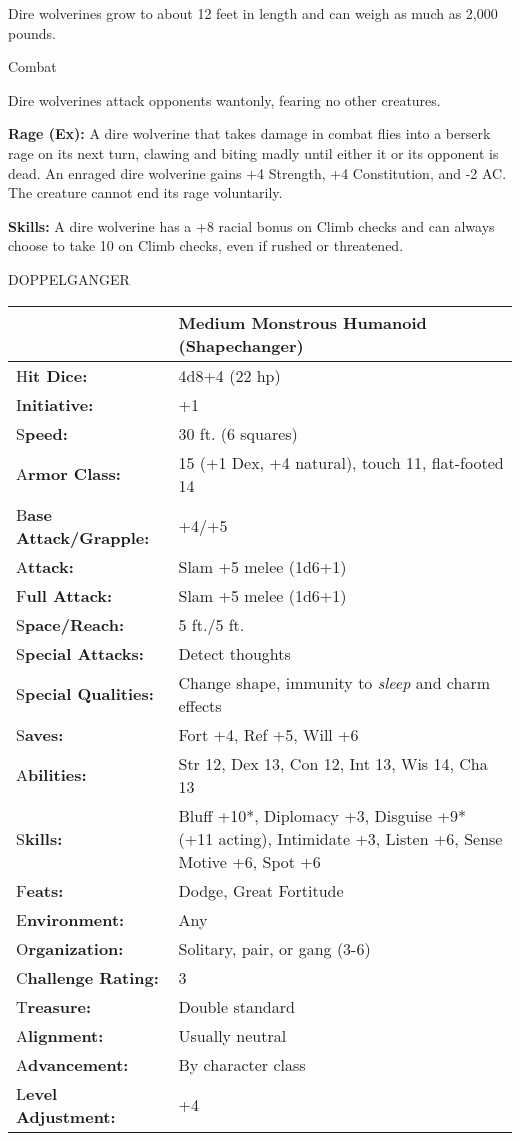 \documentclass{article}
\begin{document}
Dire wolverines grow to about 12 feet in length and can weigh as much as 2,000 
pounds.

Combat

Dire wolverines attack opponents wantonly, fearing no other creatures.

\textbf{Rage (Ex):} A dire wolverine that takes damage in combat flies into a berserk 
rage on its next turn, clawing and biting madly until either it or its opponent 
is dead. An enraged dire wolverine gains +4 Strength, +4 Constitution, and -2 AC. 
The creature cannot end its rage voluntarily.

\textbf{Skills:} A dire wolverine has a +8 racial bonus on Climb checks and can 
always choose to take 10 on Climb checks, even if rushed or threatened.

\vspace{12pt}
{\LARGE{}DOPPELGANGER}

\begin{tabular}{|>{\raggedright}p{91pt}|>{\raggedright}p{200pt}|}
\hline
  & Medium Monstrous Humanoid (Shapechanger)\tabularnewline
\hline
H\textbf{it Dice:} & 4d8+4 (22 hp)\tabularnewline
\hline
I\textbf{nitiative:} & +1\tabularnewline
\hline
S\textbf{peed:} & 30 ft. (6 squares)\tabularnewline
\hline
A\textbf{rmor Class:} & 15 (+1 Dex, +4 natural), touch 11, flat-footed 14\tabularnewline
\hline
B\textbf{ase Attack/Grapple:} & +4/+5\tabularnewline
\hline
A\textbf{ttack:} & Slam +5 melee (1d6+1)\tabularnewline
\hline
F\textbf{ull Attack:} & Slam +5 melee (1d6+1)\tabularnewline
\hline
S\textbf{pace/Reach:} & 5 ft./5 ft.\tabularnewline
\hline
S\textbf{pecial Attacks:} & Detect thoughts\tabularnewline
\hline
S\textbf{pecial Qualities:} & Change shape, immunity to \textit{sleep }and charm 
effects\tabularnewline
\hline
S\textbf{aves:} & Fort +4, Ref +5, Will +6\tabularnewline
\hline
A\textbf{bilities:} & Str 12, Dex 13, Con 12, Int 13, Wis 14, Cha 13\tabularnewline
\hline
S\textbf{kills:} & Bluff +10*, Diplomacy +3, Disguise +9* (+11 acting), Intimidate 
+3, Listen +6, Sense Motive +6, Spot +6\tabularnewline
\hline
F\textbf{eats:} & Dodge, Great Fortitude\tabularnewline
\hline
E\textbf{nvironment:} & Any\tabularnewline
\hline
O\textbf{rganization:} & Solitary, pair, or gang (3-6)\tabularnewline
\hline
C\textbf{hallenge Rating:} & 3\tabularnewline
\hline
T\textbf{reasure:} & Double standard\tabularnewline
\hline
A\textbf{lignment:} & Usually neutral\tabularnewline
\hline
A\textbf{dvancement:} & By character class\tabularnewline
\hline
L\textbf{evel Adjustment:} & +4\tabularnewline
\hline
\end{tabular}
\end{document}
